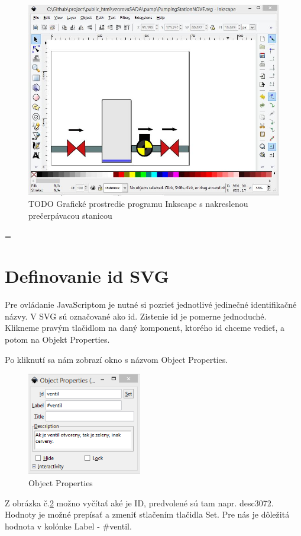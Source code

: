 \begin{figure}[H]
	\begin{center}
		\includegraphics[width=0.7\linewidth] {obrazky/pump1.jpg}
		\caption{TODO Grafické prostredie programu Inkscape s nakreslenou prečerpávacou stanicou}
		\label{picture1}
	\end{center}
\end{figure}
=


\section{Definovanie id SVG}

Pre ovládanie JavaScriptom je nutné si pozrieť jednotlivé jedinečné identifikačné názvy. V SVG sú označované ako id. Zistenie id je pomerne jednoduché. Klikneme pravým tlačidlom na daný komponent, ktorého id chceme vedieť, a potom na Objekt Properties.

Po kliknutí sa nám zobrazí okno s názvom Object Properties. 

\begin{figure}[H]
	\begin{center}
		\includegraphics [width=5cm]  {obrazky/obr3.png}
		\caption{Object Properties}
		\label{picture3}
	\end{center}
\end{figure}


Z obrázka č.\ref{picture3} možno vyčítať aké je ID, predvolené sú tam napr. desc3072. Hodnoty je možné prepísať a zmeniť stlačením tlačidla Set. Pre nás je dôležitá hodnota v kolónke Label - \#ventil. 

